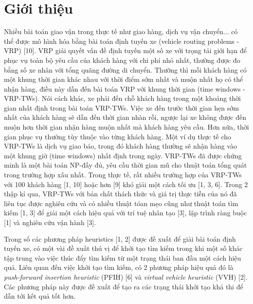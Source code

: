 \chapter{Giới thiệu}
Nhiều bài toán giao vận trong thực tế như giao hàng, dịch vụ vận chuyển... có thể được mô hình hóa bằng bài toán định tuyến xe (vehicle routing problems - VRP) [10]. VRP giải quyết vấn đề định tuyến một số xe với trọng tải giới hạn để phục vụ toàn bộ yêu cầu của khách hàng với chi phí nhỏ nhất, thường được đo bằng số xe nhân với tổng quãng đường di chuyển. Thường thì mỗi khách hàng có một khung thời gian khác nhau với thời điểm sớm nhất và muộn nhất họ có thể nhận hàng, điều này dẫn đến bài toán VRP với khung thời gian (time windows - VRP-TWs). Nói cách khác, xe phải đến chỗ khách hàng trong một khoảng thời gian nhất định trong bài toán VRP-TWs. Việc xe đến trước thời gian hẹn sớm nhất của khách hàng sẽ dẫn đến thời gian nhàn rỗi, ngược lại xe không được đến muộn hơn thời gian nhận hàng muộn nhất mà khách hàng yêu cầu. Hơn nữa, thời gian phục vụ thường tùy thuộc vào từng khách hàng. Một ví dụ thực tế cho VRP-TWs là dịch vụ giao báo, trong đó khách hàng thường sẽ nhận hàng vào một khung giờ (time windows) nhất định trong ngày. VRP-TWs đã được chứng minh là một bài toán NP-đầy đủ, yêu cầu thời gian mũ cho thuật toán tổng quát trong trường hợp xấu nhất. Trong thực tế, rất nhiều trường hợp của VRP-TWs với 100 khách hàng [1, 10] hoặc hơn [9] khó giải một cách tối ưu [1, 3, 6]. Trong 2 thập kỉ qua, VRP-TWs với bản chất thách thức và giá trị thực tiễn của nó đã liên tục được nghiên cứu và có nhiều thuật tóan mẹo cũng như thuật toán tìm kiếm [1, 3] để giải một cách hiệu quả với trí tuệ nhân tạo [3], lập trình ràng buộc [1] và nghiên cứu vận hành [3].


Trong số các phương pháp heuristics [1, 2] được đề xuất để giải bài toán định tuyến xe, có một vài đề xuất thú vị để khởi tạo tìm kiếm trong khi một số khác tập trung vào việc thúc đẩy tìm kiếm từ một trạng thái ban đầu một cách hiệu quả. Liên quan đến việc khởi tạo tìm kiếm, có 2 phương pháp hiệu quả đó là \textit{push-forward insertion heuristic} (PFIH) [6] và \textit{ virtual vehicle heuristic} (VVH) [2]. Các phương pháp này được đề xuất để tạo ra các trạng thái khởi tạo khả thi để dẫn tới kết quả tốt hơn. 